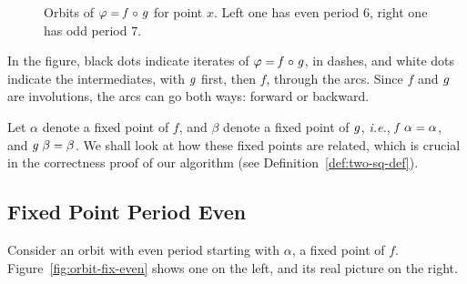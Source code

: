 \documentclass[sigplan,screen]{acmart}
\newcommand{\m}[1]{\todo[fancyline,color=blue!40,size=\scriptsize]{\textsf{JC: #1}}} %
\newcommand{\ie}{\textit{i.e.}}
\renewcommand{\HOLinline}[1]{\ensuremath{#1}} %
\renewcommand{\HOLSymConst}[1]{{\fontsize{9pt}{1em}\selectfont\textsf{\upshape #1}}}
\begin{document}
\begin{figure}[h]
\caption{Orbits of \HOLinline{\HOLFreeVar{\varphi}\;\HOLSymConst{=}\;\HOLFreeVar{f}\;\HOLSymConst{\HOLTokenCompose}\;\HOLFreeVar{g}} for point $x$. Left one has even period $6$, right one has odd period $7$.}
\label{fig:orbits-even-odd} %
\end{figure}

In the figure, black dots indicate iterates of \HOLinline{\HOLFreeVar{\varphi}\;\HOLSymConst{=}\;\HOLFreeVar{f}\;\HOLSymConst{\HOLTokenCompose}\;\HOLFreeVar{g}}, in dashes, and white dots indicate the intermediates, with \HOLinline{\HOLFreeVar{g}} first, then $f$, through the arcs.
Since $f$ and \HOLinline{\HOLFreeVar{g}} are involutions, the arcs can go both ways: forward or backward.

Let $\alpha$ denote a fixed point of $f$, and $\beta$ denote a fixed point of \HOLinline{\HOLFreeVar{g}},
\ie, \HOLinline{\HOLFreeVar{f}\;\HOLFreeVar{\alpha}\;\HOLSymConst{=}\;\HOLFreeVar{\alpha}}, and \HOLinline{\HOLFreeVar{g}\;\HOLFreeVar{\beta}\;\HOLSymConst{=}\;\HOLFreeVar{\beta}}.
We shall look at how these fixed points are related, which is crucial in the correctness proof of our algorithm (see Definition~\ref{def:two-sq-def}).

\subsection{Fixed Point Period Even}
\label{sec:fixed-point-period-even}
Consider an orbit with even period starting with $\alpha$, a fixed point of $f$.
Figure~\ref{fig:orbit-fix-even} shows one on the left, and its real picture on the right.
\end{document}
